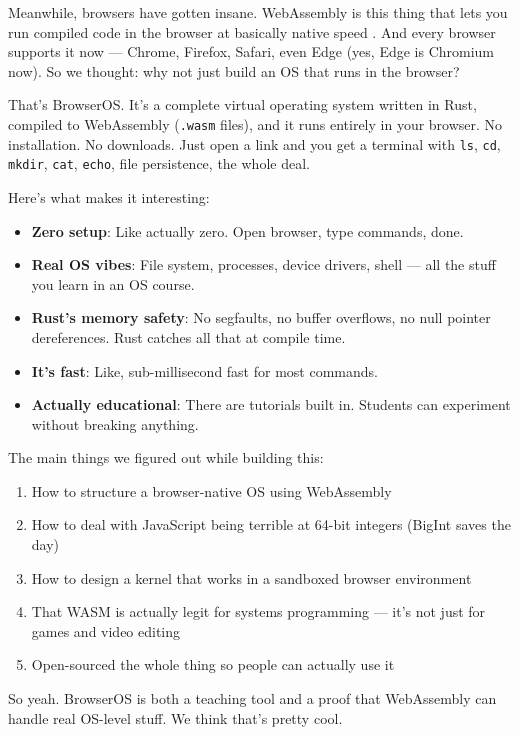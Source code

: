 \documentclass[conference]{IEEEtran}
\begin{document}
Meanwhile, browsers have gotten insane. WebAssembly is this thing that lets you run compiled code in the browser at basically native speed \cite{haas2017bringing}. And every browser supports it now — Chrome, Firefox, Safari, even Edge (yes, Edge is Chromium now). So we thought: why not just build an OS that runs in the browser?

That's BrowserOS. It's a complete virtual operating system written in Rust, compiled to WebAssembly (\texttt{.wasm} files), and it runs entirely in your browser. No installation. No downloads. Just open a link and you get a terminal with \texttt{ls}, \texttt{cd}, \texttt{mkdir}, \texttt{cat}, \texttt{echo}, file persistence, the whole deal.

Here's what makes it interesting:

\begin{itemize}
    \item \textbf{Zero setup}: Like actually zero. Open browser, type commands, done.
    \item \textbf{Real OS vibes}: File system, processes, device drivers, shell — all the stuff you learn in an OS course.
    \item \textbf{Rust's memory safety}: No segfaults, no buffer overflows, no null pointer dereferences. Rust catches all that at compile time.
    \item \textbf{It's fast}: Like, sub-millisecond fast for most commands.
    \item \textbf{Actually educational}: There are tutorials built in. Students can experiment without breaking anything.
\end{itemize}

The main things we figured out while building this:

\begin{enumerate}
    \item How to structure a browser-native OS using WebAssembly
    \item How to deal with JavaScript being terrible at 64-bit integers (BigInt saves the day)
    \item How to design a kernel that works in a sandboxed browser environment
    \item That WASM is actually legit for systems programming — it's not just for games and video editing
    \item Open-sourced the whole thing so people can actually use it
\end{enumerate}

So yeah. BrowserOS is both a teaching tool and a proof that WebAssembly can handle real OS-level stuff. We think that's pretty cool.
\end{document}
